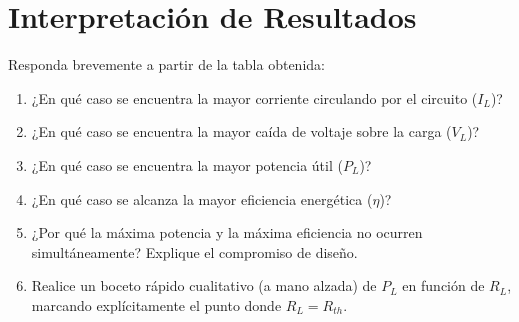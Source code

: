 \documentclass[11pt, a4paper]{article}
\begin{document}
\section*{Interpretación de Resultados}
Responda brevemente a partir de la tabla obtenida:
\begin{enumerate}
    \item ¿En qué caso se encuentra la mayor corriente circulando por el circuito ($I_L$)? \\[0.1cm] \hrulefill
    \item ¿En qué caso se encuentra la mayor caída de voltaje sobre la carga ($V_L$)? \\[0.1cm] \hrulefill
    \item ¿En qué caso se encuentra la mayor potencia útil ($P_L$)? \\[0.1cm] \hrulefill
    \item ¿En qué caso se alcanza la mayor eficiencia energética ($\eta$)? \\[0.1cm] \hrulefill
    \item ¿Por qué la máxima potencia y la máxima eficiencia no ocurren simultáneamente? Explique el compromiso de diseño.
    \vspace{2cm}
    \item Realice un boceto rápido cualitativo (a mano alzada) de $P_L$ en función de $R_L$, marcando explícitamente el punto donde $R_L = R_{th}$.
\end{enumerate}
\end{document}
